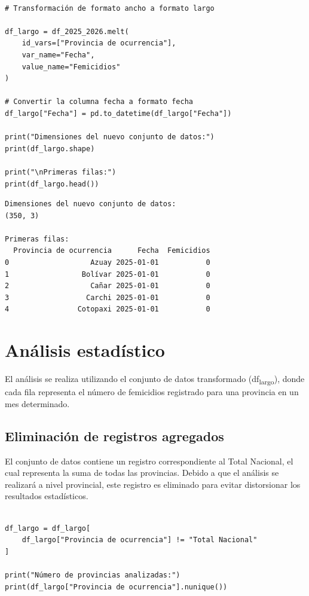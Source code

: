 \documentclass[11pt]{article}
\begin{document}
\begin{verbatim}

# Transformación de formato ancho a formato largo

df_largo = df_2025_2026.melt(
    id_vars=["Provincia de ocurrencia"],
    var_name="Fecha",
    value_name="Femicidios"
)

# Convertir la columna fecha a formato fecha
df_largo["Fecha"] = pd.to_datetime(df_largo["Fecha"])

print("Dimensiones del nuevo conjunto de datos:")
print(df_largo.shape)

print("\nPrimeras filas:")
print(df_largo.head())

\end{verbatim}

\begin{verbatim}
Dimensiones del nuevo conjunto de datos:
(350, 3)

Primeras filas:
  Provincia de ocurrencia      Fecha  Femicidios
0                   Azuay 2025-01-01           0
1                 Bolívar 2025-01-01           0
2                   Cañar 2025-01-01           0
3                  Carchi 2025-01-01           0
4                Cotopaxi 2025-01-01           0
\end{verbatim}



\section{Análisis estadístico}
\label{sec:org5e3b193}

El análisis se realiza utilizando el conjunto de datos transformado
(df\textsubscript{largo}), donde cada fila representa el número de femicidios registrado
para una provincia en un mes determinado.

\subsection{Eliminación de registros agregados}
\label{sec:org424edd9}

El conjunto de datos contiene un registro correspondiente al Total Nacional,
el cual representa la suma de todas las provincias. Debido a que el análisis
se realizará a nivel provincial, este registro es eliminado para evitar
distorsionar los resultados estadísticos.

\begin{verbatim}

df_largo = df_largo[
    df_largo["Provincia de ocurrencia"] != "Total Nacional"
]

print("Número de provincias analizadas:")
print(df_largo["Provincia de ocurrencia"].nunique())

\end{verbatim}
\end{document}
